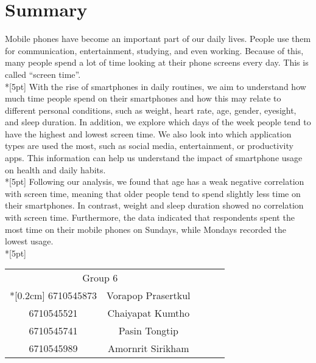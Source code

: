 \chapter*{Summary}
Mobile phones have become an important part of our daily lives. People use them for communication, entertainment, studying, and even working. Because of this, many people spend a lot of time looking at their phone screens every day. This is called ``screen time''.\\*[5pt]
With the rise of smartphones in daily routines, we aim to understand how much time people spend on their smartphones and how this may relate to different personal conditions, such as weight, heart rate, age, gender, eyesight, and sleep duration. In addition, we explore which days of the week people tend to have the highest and lowest screen time. We also look into which application types are used the most, such as social media, entertainment, or productivity apps. This information can help us understand the impact of smartphone usage on health and daily habits.\\*[5pt]
Following our analysis, we found that age has a weak negative correlation with screen time, meaning that older people tend to spend slightly less time on their smartphones. In contrast, weight and sleep duration showed no correlation with screen time. Furthermore, the data indicated that respondents spent the most time on their mobile phones on Sundays, while Mondays recorded the lowest usage.\\*[5pt]

\begin{flushright}
    \begin{tabular}{cclll}
        \multicolumn{2}{c}{Group 6}     &  &  &  \\*[0.2cm]
        6710545873 & Vorapop Prasertkul &  &  &  \\
        6710545521 & Chaiyapat Kumtho   &  &  &  \\
        6710545741 & Pasin Tongtip      &  &  &  \\
        6710545989 & Amornrit Sirikham  &  &  & 
    \end{tabular}
\end{flushright}